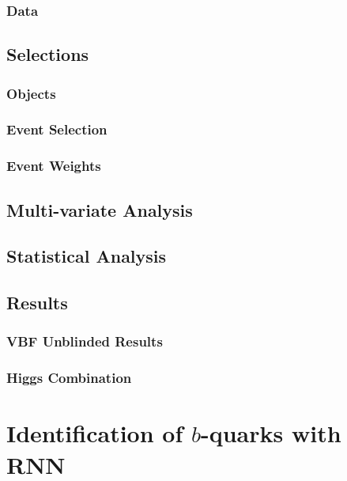 \documentclass{report}
\begin{document}
\subsection{Data}

\clearpage

\section{Selections}
\subsection{Objects}

\subsection{Event Selection}

\subsection{Event Weights}

\clearpage

\section{Multi-variate Analysis}

\clearpage

\section{Statistical Analysis}

\clearpage

\section{Results}
\subsection{VBF \Hbb Unblinded Results}

\clearpage
\subsection{Higgs Combination}


\clearpage


\chapter{Identification of $b$-quarks with RNN}
\label{chap:btagging}
\end{document}
